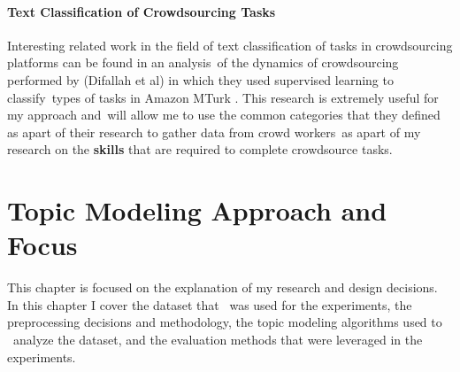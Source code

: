 \documentclass[letterpaper,12pt]{article}
\begin{document}

\subsubsection{Text Classification of Crowdsourcing Tasks}
Interesting related work in the field of text classification of tasks in crowdsourcing platforms can be found in an analysis\
of the dynamics of crowdsourcing performed by (Difallah et al) in which they used supervised learning to classify\
types of tasks in Amazon MTurk \cite{difallah2015dynamics}. This research is extremely useful for my approach and\
will allow me to use the common categories that they defined as apart of their research to gather data from crowd workers\
as apart of my research on the \textbf{skills} that are required to complete crowdsource tasks.

\chapter{Topic Modeling Approach and Focus}
This chapter is focused on the explanation of my research and design decisions. In this chapter I cover the dataset that \
was used for the experiments, the preprocessing decisions and methodology, the topic modeling algorithms used to \
analyze the dataset, and the evaluation methods that were leveraged in the experiments.

\end{document}
